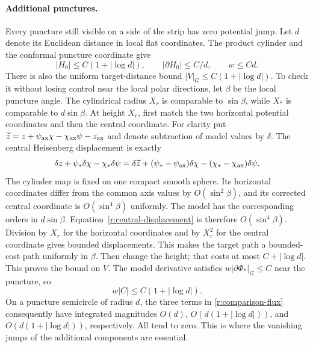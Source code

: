 \paragraph{Additional punctures.}
Every puncture still visible on a side of the strip has zero potential
jump.  Let $d$ denote its Euclidean distance in local flat coordinates.
The product cylinder and the conformal puncture coordinate give
\begin{equation}\label{r:puncture-estimates}
 |H_0|\le C(1+|\log d|),\qquad
 |\partial H_0|\le C/d,\qquad w\le Cd.
\end{equation}
There is also the uniform target-distance bound
$|V|_G\le C(1+|\log d|)$.  To check it without losing control near the
local polar directions, let $\beta$ be the local puncture angle.
The cylindrical radius $X_r$ is comparable to $\sin\beta$, while
$X_*$ is comparable to $d\sin\beta$.  At height $X_r$, first match the
two horizontal potential coordinates and then the central coordinate.
For clarity put
$\widetilde z=z+\psi_{\rm ax}\chi-\chi_{\rm ax}\psi-z_{\rm ax}$
and denote subtraction of model values by $\delta$.  The central
Heisenberg displacement is exactly
\begin{equation}\label{r:central-displacement}
 \delta z+\psi_*\delta\chi-\chi_*\delta\psi
 =\delta\widetilde z
  +(\psi_*-\psi_{\rm ax})\delta\chi
  -(\chi_*-\chi_{\rm ax})\delta\psi.
\end{equation}
The cylinder map is fixed on one compact smooth sphere.  Its horizontal
coordinates differ from the common axis values by $O(\sin^2\beta)$,
and its corrected central coordinate is $O(\sin^4\beta)$ uniformly.
The model has the corresponding orders in $d\sin\beta$.
Equation~\eqref{r:central-displacement} is therefore
$O(\sin^4\beta)$.  Division by $X_r$ for the horizontal coordinates
and by $X_r^2$ for the central coordinate gives bounded displacements.
This makes the target path a bounded-cost path uniformly in $\beta$.
Then change the height;
that costs at most $C+|\log d|$.  This proves the bound on $V$.
The model derivative satisfies $w|\partial\Phi_*|_G\le C$ near the
puncture, so
\[
 w|C|\le C(1+|\log d|).
\]
On a puncture semicircle of radius $d$, the three terms in
\eqref{r:comparison-flux} consequently have integrated magnitudes
$O(d)$, $O(d(1+|\log d|))$, and $O(d(1+|\log d|))$, respectively.
All tend to zero.  This is where the vanishing jumps of the additional
components are essential.

